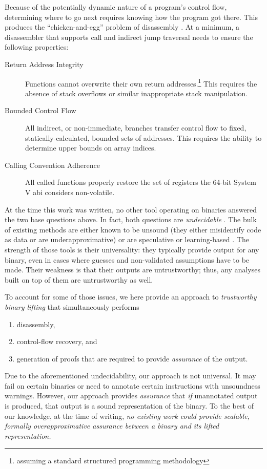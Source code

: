 Because of the potentially dynamic nature of a program's control flow, determining where to go next requires knowing how the program got there.
This produces the ``chicken-and-egg'' problem of disassembly \autocite{schwartz2002disassembly}.
At a minimum, a disassembler that supports call and indirect jump traversal needs to ensure the following properties:
\begin{description}
  \item[Return Address Integrity] Functions cannot overwrite their own return addresses.\footnote{assuming a standard structured programming methodology} This requires the absence of stack overflows or similar inappropriate stack manipulation.
  \item[Bounded Control Flow] All indirect, or non-immediate, branches transfer control flow to fixed, statically-calculated, bounded sets of addresses. This requires the ability to determine upper bounds on array indices.
  \item[Calling Convention Adherence] All called functions properly restore the set of registers the 64-bit System V \ac{abi} considers non-volatile.
\end{description}
At the time this work was written, no other tool operating on binaries answered the two base questions above.
In fact, both questions are \emph{undecidable} \autocite{rice1953classes,horspool1980approach}.
The bulk of existing methods are either known to be unsound (they either  misidentify code as data or are underapproximative) \autocite{schwartz2002disassembly} or are speculative or learning-based \autocite{wartell2011differentiating,khadra2016speculative}.
The strength of those tools is their universality: they typically provide output for any binary, even in cases where guesses and non-validated assumptions have to be made.
Their weakness is that their outputs are untrustworthy; thus, any analyses built on top of them are untrustworthy as well.

To account for some of those issues, we here provide an approach to \emph{trustworthy binary lifting} that simultaneously performs
\begin{enumerate}
  \item disassembly,
  \item control-flow recovery, and
  \item generation of proofs that are required to provide \emph{assurance} of the output.
\end{enumerate}
Due to the aforementioned undecidability, our approach is not universal.
It may fail on certain binaries or need to annotate certain instructions
with unsoundness warnings.
However, our approach provides \emph{assurance} that \emph{if} unannotated output is produced, that output is a sound representation of the binary.
To the best of our knowledge, at the time of writing,
\emph{no existing work could provide scalable, formally overapproximative
  assurance between a binary and its lifted representation.}

